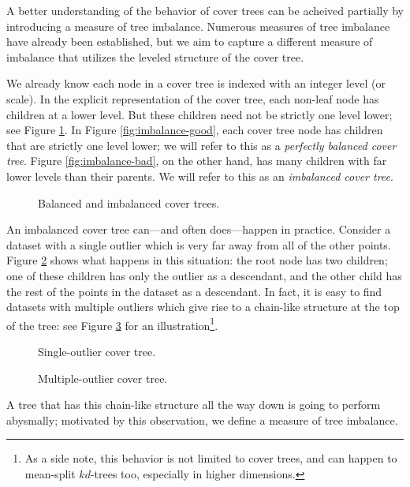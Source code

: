 A better understanding of the behavior of cover trees can be acheived partially
by introducing a measure of tree imbalance.  Numerous measures of tree imbalance
have already been established, but we aim to capture a different measure of
imbalance that utilizes the leveled structure of the cover tree.

We already know each node in a cover tree is indexed with an integer level (or
scale).  In the explicit representation of the cover tree, each non-leaf node
has children at a lower level.  But these children need not be strictly one
level lower; see Figure \ref{fig:imbalance}.  In Figure
\ref{fig:imbalance-good}, each cover tree node has children that are strictly
one level lower; we will refer to this as a {\em perfectly balanced cover tree}.
Figure \ref{fig:imbalance-bad}, on the other hand, has many children with far
lower levels than their parents.  We will refer to this as an {\em imbalanced
cover tree}.

\begin{figure}
\caption{Balanced and imbalanced cover trees.}
\label{fig:imbalance}
\end{figure}

An imbalanced cover tree can---and often does---happen in practice.  Consider a
dataset with a single outlier which is very far away from all of the other
points.  Figure \ref{fig:outlier} shows what happens in this situation: the root
node has two children; one of these children has only the outlier as a
descendant, and the other child has the rest of the points in the dataset as a
descendant.  In fact, it is easy to find datasets with multiple outliers which
give rise to a chain-like structure at the top of the tree: see Figure
\ref{fig:outliers} for an illustration\footnote{As a side note, this behavior is
not limited to cover trees, and can happen to mean-split $kd$-trees too,
especially in higher dimensions.}.

\begin{figure}
\caption{Single-outlier cover tree.}
\label{fig:outlier}
\end{figure}

\begin{figure}
\caption{Multiple-outlier cover tree.}
\label{fig:outliers}
\end{figure}

A tree that has this chain-like structure all the way down is going to perform
abysmally; motivated by this observation, we define a measure of tree imbalance.

